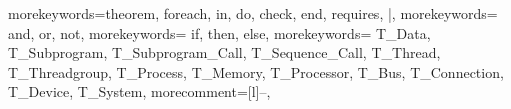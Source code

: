 
{morekeywords={theorem, foreach, in, do, check, end, requires, |},
   morekeywords= {and, or, not}, 
   morekeywords= {if, then, else}, 
   morekeywords= {T_Data, T_Subprogram, T_Subprogram_Call, T_Sequence_Call, T_Thread, T_Threadgroup, T_Process, T_Memory, T_Processor, T_Bus, T_Connection, T_Device, T_System},
  morecomment=[l]{--},
}


\lstset{language=real,
        basicstyle=\scriptsize\sffamily,
        aboveskip=.1cm, %
        belowskip=.1cm, %
        abovecaptionskip=.1cm, %
        belowcaptionskip=.1cm, %
        xleftmargin=.0cm,
        captionpos=b,
        tabsize=3,
        numberstyle=\tiny, 
        frame=single,
        }

